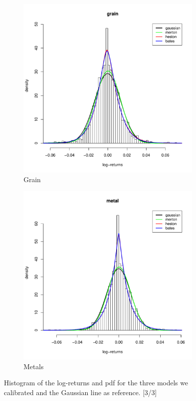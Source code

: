 \begin{figure}
	\begin{subfigure}{0.44\textwidth}
		\centering
		\includegraphics[width=\linewidth]{Images/hist_grain.pdf}
		\caption{Grain}
	\end{subfigure}
	\begin{subfigure}{0.44\textwidth}
		\centering
		\includegraphics[width=\linewidth]{Images/hist_metal.pdf}
		\caption{Metals}
	\end{subfigure}
	
	\caption{Histogram of the log-returns and pdf for the three models we calibrated and the Gaussian line as reference. [3/3]}
	\label{fig:hist_3}
\end{figure}

